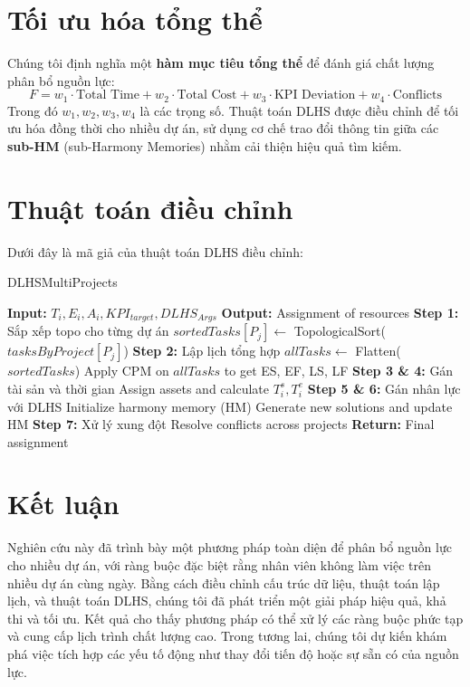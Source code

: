 \documentclass[a4paper,12pt]{article}
\begin{document}
\section{Tối ưu hóa tổng thể}

Chúng tôi định nghĩa một \textbf{hàm mục tiêu tổng thể} để đánh giá chất lượng phân bổ nguồn lực:
\[
F = w_1 \cdot \text{Total Time} + w_2 \cdot \text{Total Cost} + w_3 \cdot \text{KPI Deviation} + w_4 \cdot \text{Conflicts}
\]
Trong đó $w_1, w_2, w_3, w_4$ là các trọng số. Thuật toán DLHS được điều chỉnh để tối ưu hóa đồng thời cho nhiều dự án, sử dụng cơ chế trao đổi thông tin giữa các \textbf{sub-HM} (sub-Harmony Memories) nhằm cải thiện hiệu quả tìm kiếm.

\section{Thuật toán điều chỉnh}

Dưới đây là mã giả của thuật toán DLHS điều chỉnh:

\begin{algorithm}
\caption{DLHSMultiProjects}
\begin{algorithmic}[1]
\State \textbf{Input:} $T_i, E_i, A_i, KPI_{target}, DLHS_{Args}$
\State \textbf{Output:} Assignment of resources
\State \textbf{Step 1:} Sắp xếp topo cho từng dự án
    \State $sortedTasks[P_j] \gets$ TopologicalSort($tasksByProject[P_j]$)
\EndFor
\State \textbf{Step 2:} Lập lịch tổng hợp
\State $allTasks \gets$ Flatten($sortedTasks$)
\State Apply CPM on $allTasks$ to get ES, EF, LS, LF
\State \textbf{Step 3 \& 4:} Gán tài sản và thời gian
    \State Assign assets and calculate $T_i^s, T_i^e$
\EndFor
\State \textbf{Step 5 \& 6:} Gán nhân lực với DLHS
\State Initialize harmony memory (HM)
    \State Generate new solutions and update HM
\EndWhile
\State \textbf{Step 7:} Xử lý xung đột
    \State Resolve conflicts across projects
\EndFor
\State \textbf{Return:} Final assignment
\end{algorithmic}
\end{algorithm}

\section{Kết luận}

Nghiên cứu này đã trình bày một phương pháp toàn diện để phân bổ nguồn lực cho nhiều dự án, với ràng buộc đặc biệt rằng nhân viên không làm việc trên nhiều dự án cùng ngày. Bằng cách điều chỉnh cấu trúc dữ liệu, thuật toán lập lịch, và thuật toán DLHS, chúng tôi đã phát triển một giải pháp hiệu quả, khả thi và tối ưu. Kết quả cho thấy phương pháp có thể xử lý các ràng buộc phức tạp và cung cấp lịch trình chất lượng cao. Trong tương lai, chúng tôi dự kiến khám phá việc tích hợp các yếu tố động như thay đổi tiến độ hoặc sự sẵn có của nguồn lực.
\end{document}
